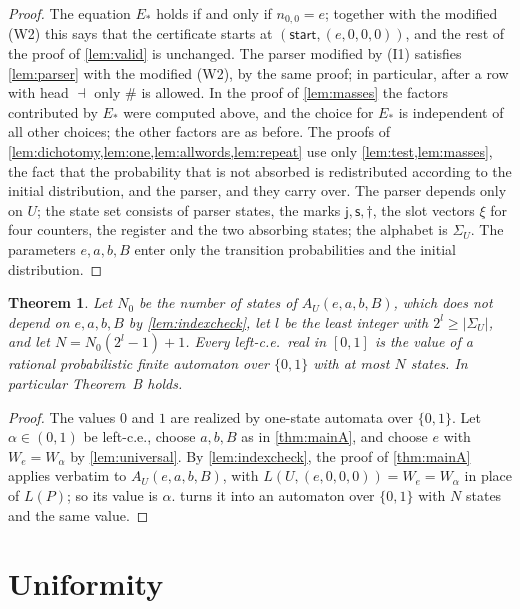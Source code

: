 \documentclass[11pt]{article}
\theoremstyle{plain}
\newtheorem{theorem}{Theorem}[section]
\theoremstyle{definition}
\theoremstyle{remark}
\newcommand{\jt}{\mathsf{j}}
\newcommand{\spl}{\mathsf{s}}
\newcommand{\dead}{\dagger}
\newcommand{\start}{\mathsf{start}}
\newcommand{\fin}{\dashv}
\begin{document}
\begin{proof}
The equation $E_*$ holds if and only if $n_{0,0}=e$; together with the modified (W2) this says that the certificate starts at $(\start,(e,0,0,0))$, and the rest of the proof of \cref{lem:valid} is unchanged. The parser modified by (I1) satisfies \cref{lem:parser} with the modified (W2), by the same proof; in particular, after a row with head $\fin$ only $\#$ is allowed. In the proof of \cref{lem:masses} the factors contributed by $E_*$ were computed above, and the choice for $E_*$ is independent of all other choices; the other factors are as before. The proofs of \cref{lem:dichotomy,lem:one,lem:allwords,lem:repeat} use only \cref{lem:test,lem:masses}, the fact that the probability that is not absorbed is redistributed according to the initial distribution, and the parser, and they carry over. The parser depends only on $U$; the state set consists of parser states, the marks $\jt,\spl,\dead$, the slot vectors $\xi$ for four counters, the register and the two absorbing states; the alphabet is $\Sigma_U$. The parameters $e,a,b,B$ enter only the transition probabilities and the initial distribution.
\end{proof}

\begin{theorem}\label{thm:mainB}
Let $N_0$ be the number of states of $A_U(e,a,b,B)$, which does not depend on $e,a,b,B$ by \cref{lem:indexcheck}, let $l$ be the least integer with $2^l\ge|\Sigma_U|$, and let $N=N_0(2^l-1)+1$. Every left-c.e.\ real in $[0,1]$ is the value of a rational probabilistic finite automaton over $\{0,1\}$ with at most $N$ states. In particular Theorem~B holds.
\end{theorem}

\begin{proof}
The values $0$ and $1$ are realized by one-state automata over $\{0,1\}$. Let $\alpha\in(0,1)$ be left-c.e., choose $a,b,B$ as in \cref{thm:mainA}, and choose $e$ with $W_e=W_\alpha$ by \cref{lem:universal}. By \cref{lem:indexcheck}, the proof of \cref{thm:mainA} applies verbatim to $A_U(e,a,b,B)$, with $L(U,(e,0,0,0))=W_e=W_\alpha$ in place of $L(P)$; so its value is $\alpha$.  turns it into an automaton over $\{0,1\}$ with $N$ states and the same value.
\end{proof}

\section{Uniformity}\label{sec:uniform}
\end{document}
